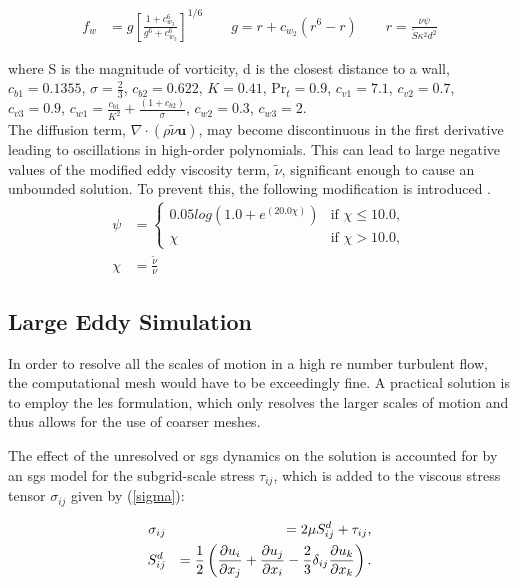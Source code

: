 \begin{align}
	f_w &= g\left[\frac{1 + c_{w_3}^6}{g^6 + c_{w_3}^6}\right]^{1/6} 
	\qquad g = r + c_{w_2}(r^6 - r) 
	\qquad r = \frac{\nu\psi}{\tilde S \kappa^2 d^2}
\end{align}

where S is the magnitude of vorticity, d is the closest distance to a wall, $c_{b1} = 0.1355$, $\sigma = \frac{2}{3}$, $c_{b2} = 0.622$, $K = 0.41$, $\text{Pr}_t = 0.9$, $c_{v1} = 7.1$, $c_{v2} = 0.7$, $c_{v3} = 0.9$, $c_{w1} = \frac{c_{b1}}{K^2} + \frac{(1+c_{b2})}{\sigma}$, $c_{w2} = 0.3$, $c_{w3} = 2$.\\

The diffusion term, $\nabla\cdot(\rho\tilde\nu\boldsymbol{u})$, may become discontinuous in the first derivative leading to oscillations in high-order polynomials. This can lead to large negative values of the modified eddy viscosity term, $\tilde\nu$, significant enough to cause an unbounded solution. To prevent this, the following modification is introduced \cite{moro2011navier}.
\begin{align}
	\psi &=
	\begin{cases}
	   0.05log(1.0 + e^{(20.0\chi)}) & \text{if } \chi \le 10.0, \\
	   \chi & \text{if } \chi > 10.0,
	\end{cases} \\
	\chi &= \frac{\tilde\nu}{\nu}
\end{align}

\subsection{Large Eddy Simulation}\label{lesmodels}

In order to resolve all the scales of motion in a high \gls{re} number turbulent flow, the computational mesh would have to be exceedingly fine.
A practical solution is to employ the \gls{les} formulation, which only resolves the larger scales of motion and thus allows for the use of coarser meshes.

The effect of the unresolved or \gls{sgs} dynamics on the solution is accounted for by an \gls{sgs} model for the subgrid-scale stress $\tau_{ij}$, which is added to the viscous stress tensor $\sigma_{ij}$ given by (\ref{sigma}):

\begin{eqnarray}\label{tausgs}
\sigma_{ij} &&= 2 \mu S^d_{ij} + \tau_{ij},\\
S^d_{ij} &&= \frac 1 2 \left( \frac{\partial u_i}{\partial x_j} + \frac{\partial u_j}{\partial x_i} - \frac{2}{3} \delta_{ij}\frac{\partial u_k}{\partial x_k} \right).
\end{eqnarray}

